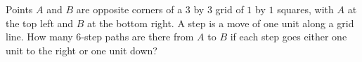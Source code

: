 Points $A$ and $B$ are opposite corners of a $3$ by $3$ grid of $1$ by $1$ squares, with $A$ at the top left and $B$ at the bottom right. A step is a move of one unit along a grid line. How many $6$-step paths are there from $A$ to $B$ if each step goes either one unit to the right or one unit down?
